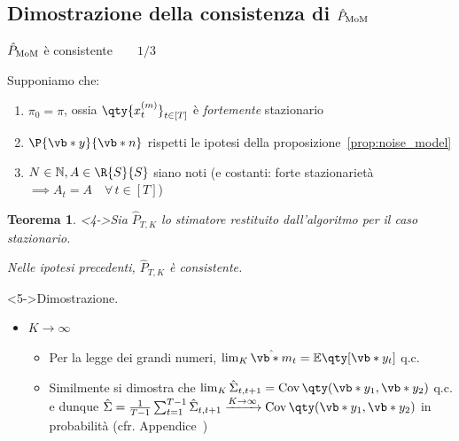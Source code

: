 \documentclass[10pt,xcolor={table,dvipsnames}]{beamer} 		%
\theoremstyle{plain}					%
\newtheorem{teorema}{Teorema}%
\theoremstyle{definition}
\theoremstyle{remark}
\newcommand{\Cov}[1]{\operatorname{Cov}\qty(#1)}
\begin{document}
	\subsection{Dimostrazione della consistenza di \texorpdfstring{$\hat{P}_{\textup{MoM}}$}{P_mom}}

	\begin{frame}
        {\hypertarget{frame:teorema_1_part1}{$\hat{P}_{\textup{MoM}}$ è consistente$\qquad 1/3$}}

        Supponiamo che:
        \begin{enumerate}
            \item $\pi_0=\pi$, ossia $\qty{x_t^{(m)}}_{t\in[T]}$ è \emph{fortemente} stazionario
            \item<2-> $\P{\vb*{y}}{\vb*{n}}$ rispetti le ipotesi della proposizione~\ref{prop:noise_model}
            \item<3-> $N\in\mathbb{N}, A\in\R{S}{S}$ siano noti {\smaller (e costanti: forte stazionarietà $\implies A_t=A\quad\forall\,t\in[T]$)}
        \end{enumerate}

        \begin{teorema}<4->\label{teor:consistenza_P_mom}
            Sia $\hat{P}_{T,K}$ lo stimatore restituito dall'algoritmo per il caso stazionario.

            Nelle ipotesi precedenti, $\hat{P}_{T,K}$ è consistente.%
        \end{teorema}
        \begin{block}<5->{Dimostrazione.}
            \begin{itemize}
                \item ${K\to\infty}$
                \begin{itemize}
                    \item<5-> Per la legge dei grandi numeri, $\lim_K\hat{\vb*{m}}_t=\mathbb{E}\qty[\vb*{y}_t]$ q.c.
                    \item<7-> Similmente si dimostra che $\lim_K\hat{\Sigma}_{t,t+1}=\Cov{\vb*{y}_1,\vb*{y}_2}$ q.c.
                    e dunque $\hat{\Sigma}=\frac{1}{T-1}\sum_{t=1}^{T-1}\hat{\Sigma}_{t,t+1}\xrightarrow{K\to\infty}\Cov{\vb*{y}_1,\vb*{y}_2}$ in probabilità
                    (cfr. Appendice~\hyperlink{frame:teorema1_lim_Sigmahat:appendice}{\faHandPointRight})
                \end{itemize}
            \end{itemize}
        \end{block}
    \end{frame}
\end{document}
